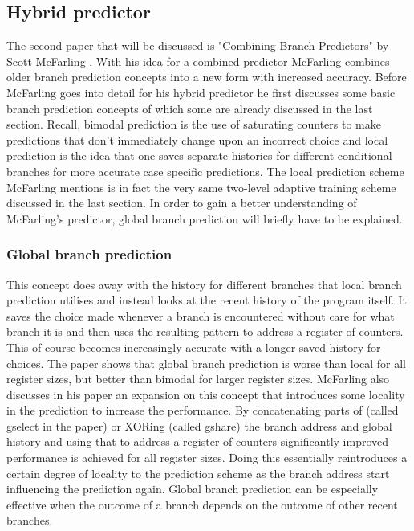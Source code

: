 \subsection{Hybrid predictor}
The second paper that will be discussed is "Combining Branch Predictors" by Scott McFarling \cite{hybrid}. With his idea for a combined predictor McFarling combines older branch prediction concepts into a new form with increased accuracy. Before McFarling goes into detail for his hybrid predictor he first discusses some basic branch prediction concepts of which some are already discussed in the last section. Recall, bimodal prediction is the use of saturating counters to make predictions that don't immediately change upon an incorrect choice and local prediction is the idea that one saves separate histories for different conditional branches for more accurate case specific predictions. The local prediction scheme McFarling mentions is in fact the very same two-level adaptive training scheme discussed in the last section. In order to gain a better understanding of McFarling's predictor, global branch prediction will briefly have to be explained.
\subsubsection{Global branch prediction}
This concept does away with the history for different branches that local branch prediction utilises and instead looks at the recent history of the program itself. It saves the choice made whenever a branch is encountered without care for what branch it is and then uses the resulting pattern to address a register of counters. This of course becomes increasingly accurate with a longer saved history for choices. The paper shows that global branch prediction is worse than local for all register sizes, but better than bimodal for larger register sizes. McFarling also discusses in his paper an expansion on this concept that introduces some locality in the prediction to increase the performance. By concatenating parts of (called gselect in the paper) or XORing (called gshare) the branch address and global history and using that to address a register of counters significantly improved performance is achieved for all register sizes. Doing this essentially reintroduces a certain degree of locality to the prediction scheme as the branch address start influencing the prediction again. Global branch prediction can be especially effective when the outcome of a branch depends on the outcome of other recent branches.
